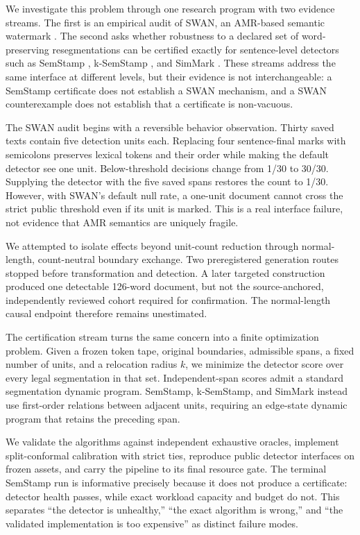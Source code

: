 \documentclass[10pt]{article}
\begin{document}
We investigate this problem through one research program with two evidence
streams. The first is an empirical audit of SWAN, an AMR-based semantic
watermark \citep{ye2026swan}. The second asks whether robustness to a declared
set of word-preserving resegmentations can be certified exactly for
sentence-level detectors such as SemStamp \citep{hou2024semstamp},
k-SemStamp \citep{hou2024ksemstamp}, and SimMark
\citep{dabiriaghdam2025simmark}. These streams address the same interface at
different levels, but their evidence is not interchangeable: a SemStamp
certificate does not establish a SWAN mechanism, and a SWAN counterexample
does not establish that a certificate is non-vacuous.

The SWAN audit begins with a reversible behavior observation. Thirty saved
texts contain five detection units each. Replacing four sentence-final marks
with semicolons preserves lexical tokens and their order while making the
default detector see one unit. Below-threshold decisions change from 1/30 to
30/30. Supplying the detector with the five saved spans restores the count to
1/30. However, with SWAN's default null rate, a one-unit document cannot
cross the strict public threshold even if its unit is marked. This is a real
interface failure, not evidence that AMR semantics are uniquely fragile.

We attempted to isolate effects beyond unit-count reduction through
normal-length, count-neutral boundary exchange. Two preregistered generation
routes stopped before transformation and detection. A later targeted
construction produced one detectable 126-word document, but not the
source-anchored, independently reviewed cohort required for confirmation. The
normal-length causal endpoint therefore remains unestimated.

The certification stream turns the same concern into a finite optimization
problem. Given a frozen token tape, original boundaries, admissible spans, a
fixed number of units, and a relocation radius $k$, we minimize the detector
score over every legal segmentation in that set. Independent-span scores
admit a standard segmentation dynamic program. SemStamp, k-SemStamp, and
SimMark instead use first-order relations between adjacent units, requiring
an edge-state dynamic program that retains the preceding span.

We validate the algorithms against independent exhaustive oracles, implement
split-conformal calibration with strict ties, reproduce public detector
interfaces on frozen assets, and carry the pipeline to its final resource
gate. The terminal SemStamp run is informative precisely because it does not
produce a certificate: detector health passes, while exact workload capacity
and budget do not. This separates ``the detector is unhealthy,'' ``the exact
algorithm is wrong,'' and ``the validated implementation is too expensive''
as distinct failure modes.
\end{document}
